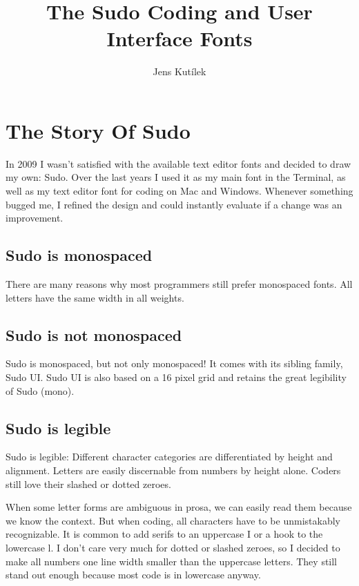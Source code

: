 \documentclass[paper=a4, 12pt]{scrbook}
\title{The Sudo Coding and User Interface Fonts}
\author{Jens Kutílek}
\begin{document}
\maketitle

\tableofcontents

\chapter{The Story Of Sudo}

In 2009 I wasn’t satisfied with the available text editor fonts and decided to draw my own: Sudo. Over the last years I used it as my main font in the Terminal, as well as my text editor font for coding on Mac and Windows. Whenever something bugged me, I refined the design and could instantly evaluate if a change was an improvement.

\section{Sudo is mono­spaced}

There are many reasons why most programmers still prefer monospaced fonts. All letters have the same width in all weights.

\section{Sudo is not mono­spaced}
Sudo is monospaced, but not only monospaced! It comes with its sibling family, Sudo UI. Sudo UI is also based on a 16 pixel grid and retains the great legibility of Sudo (mono).

\section{Sudo is legible}
Sudo is legible: Different character categories are differentiated by height and alignment. Letters are easily discernable from numbers by height alone. Coders still love their slashed or dotted zeroes.

When some letter forms are ambiguous in prosa, we can easily read them because we know the context. But when coding, all characters have to be unmistakably recognizable. It is common to add serifs to an uppercase I or a hook to the lowercase l. I don’t care very much for dotted or slashed zeroes, so I decided to make all numbers one line width smaller than the uppercase letters. They still stand out enough because most code is in lowercase anyway.
\end{document}
